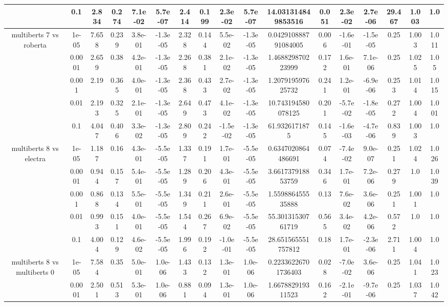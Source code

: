 \begin{tabular}{|c|c|c|c|c|c|c|c|c|c|c|c|c|c|c|c|c|}
 & 0.1 & 2.834 & 0.274 & 7.1e-02 & 5.7e-07 & 2.414 & 0.199 & 2.3e-02 & 5.7e-07 & 14.031314849853516 & 0.051 & 2.3e-02 & 2.7e-06 & 29.467 & 1.003 & 1.0 \\
\hline
\multirow{5}{*}{multiberts 7 vs roberta } & 1e-05 & 7.658 & 0.239 & 3.8e-01 & -1.3e-05 & 2.328 & 0.144 & 5.5e-02 & -1.3e-05 & 0.042910888791084005 & 0.006 & -1.6e-01 & -1.5e-05 & 0.25 & 1.003 & 1.011 \\
 & 0.0001 & 2.659 & 0.38 & 4.2e-01 & -1.3e-05 & 2.268 & 0.381 & 2.1e-02 & -1.3e-05 & 1.468829870223999 & 0.172 & 1.6e-01 & 7.1e-06 & 0.25 & 1.025 & 1.05 \\
 & 0.001 & 2.19 & 0.365 & 4.0e-01 & -1.3e-05 & 2.368 & 0.433 & 2.7e-02 & -1.3e-05 & 1.207919597625732 & 0.241 & 1.2e-01 & -6.9e-06 & 0.253 & 1.014 & 1.015 \\
 & 0.01 & 2.193 & 0.325 & 2.1e-01 & -1.3e-05 & 2.649 & 0.473 & 4.1e-02 & -1.3e-05 & 10.743194580078125 & 0.201 & -5.7e-02 & -1.8e-05 & 0.272 & 1.004 & 1.001 \\
 & 0.1 & 4.047 & 0.406 & 3.3e-02 & -1.3e-05 & 2.809 & 0.242 & -1.5e-02 & -1.3e-05 & 61.9326171875 & 0.145 & -1.6e-03 & -4.7e-06 & 0.839 & 1.003 & 1.0 \\
\hline
\multirow{5}{*}{multiberts 8 vs electra } & 1e-05 & 1.187 & 0.16 & 4.3e-01 & -5.5e-05 & 1.337 & 0.191 & 1.7e-01 & -5.5e-05 & 0.6347020864486691 & 0.074 & -7.4e-02 & 9.0e-07 & 0.251 & 1.024 & 1.026 \\
 & 0.0001 & 0.944 & 0.157 & 5.4e-01 & -5.5e-05 & 1.289 & 0.206 & 4.3e-01 & -5.5e-05 & 3.661737918853759 & 0.346 & 1.7e-01 & 7.2e-06 & 0.279 & 1.0 & 1.039 \\
 & 0.001 & 0.868 & 0.134 & 5.5e-01 & -5.5e-05 & 1.349 & 0.211 & 2.6e-01 & -5.5e-05 & 1.559886455535888 & 0.13 & 7.6e-02 & 3.6e-06 & 0.251 & 1.001 & 1.0 \\
 & 0.01 & 0.993 & 0.151 & 4.0e-01 & -5.5e-05 & 1.544 & 0.267 & 6.9e-02 & -5.5e-05 & 55.30131530761719 & 0.565 & 3.4e-02 & 4.2e-06 & 0.572 & 1.0 & 1.0 \\
 & 0.1 & 4.004 & 0.129 & 4.6e-02 & -5.5e-05 & 1.996 & 0.192 & -1.0e-01 & -5.5e-05 & 28.651565551757812 & 0.18 & 1.7e-01 & -2.3e-06 & 2.711 & 1.004 & 1.0 \\
\hline
\multirow{5}{*}{multiberts 8 vs multiberts 0} & 1e-05 & 7.584 & 0.35 & 5.0e-01 & 1.0e-06 & 1.433 & 0.132 & 1.3e-01 & 1.0e-06 & 0.22336226701736403 & 0.028 & -7.0e-02 & 3.6e-06 & 0.25 & 1.041 & 1.023 \\
 & 0.0001 & 2.501 & 0.513 & 5.3e-01 & 1.0e-06 & 0.881 & 0.094 & 1.3e-01 & 1.0e-06 & 1.667882919311523 & 0.162 & -2.1e-01 & -9.7e-06 & 0.25 & 1.037 & 1.042 \\

\end{tabular}
